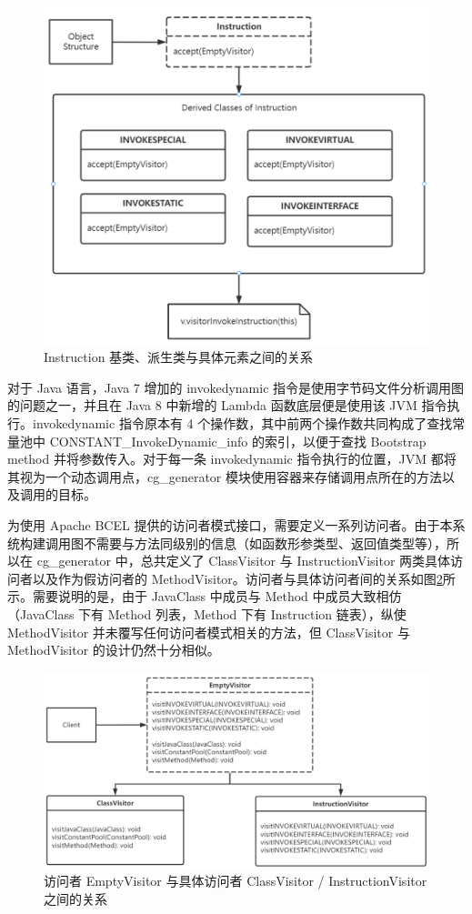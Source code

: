 \begin{figure}[htb]
    \centering
    \includegraphics[width=.8\textwidth]{figures/cg-generator-object-structure.png}
    \caption{Instruction 基类、派生类与具体元素之间的关系}
    \label{fig:cg-generator-object-structure}
\end{figure}

对于 Java 语言，Java 7 增加的 invokedynamic 指令是使用字节码文件分析调用图的问题之一，并且在 Java 8 中新增的 Lambda 函数底层便是使用该 JVM 指令执行。invokedynamic 指令原本有 4 个操作数，其中前两个操作数共同构成了查找常量池中 CONSTANT\_InvokeDynamic\_info 的索引，以便于查找 Bootstrap method 并将参数传入。对于每一条 invokedynamic 指令执行的位置，JVM 都将其视为一个动态调用点，cg\_generator 模块使用容器来存储调用点所在的方法以及调用的目标。

为使用 Apache BCEL 提供的访问者模式接口，需要定义一系列访问者。由于本系统构建调用图不需要与方法同级别的信息（如函数形参类型、返回值类型等），所以在 cg\_generator 中，总共定义了 ClassVisitor 与 InstructionVisitor 两类具体访问者以及作为假访问者的 MethodVisitor。访问者与具体访问者间的关系如图\ref{fig:cg-generator-client}所示。需要说明的是，由于 JavaClass 中成员与 Method 中成员大致相仿（JavaClass 下有 Method 列表，Method 下有 Instruction 链表），纵使 MethodVisitor 并未覆写任何访问者模式相关的方法，但 ClassVisitor 与 MethodVisitor 的设计仍然十分相似。

\begin{figure}[htb]
    \centering
    \includegraphics[width=.9\textwidth]{figures/cg-generator-client.png}
    \caption{访问者 EmptyVisitor 与具体访问者 ClassVisitor / InstructionVisitor 之间的关系}
    \label{fig:cg-generator-client}
\end{figure}

